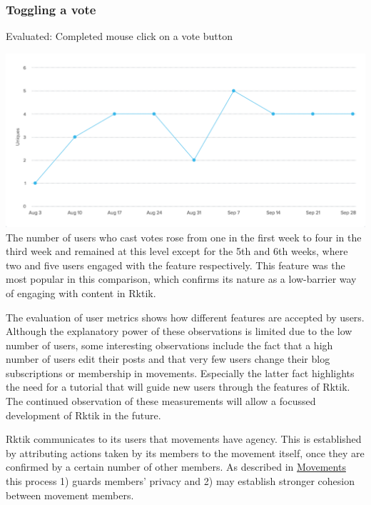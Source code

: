 \subsubsection{Toggling a vote}\label{toggling-a-vote}

Evaluated: Completed mouse click on a vote button

\includegraphics{img/eval_vote.png}\\
 The number of users who cast votes rose from one in the first week to
four in the third week and remained at this level except for the 5th and
6th weeks, where two and five users engaged with the feature
respectively. This feature was the most popular in this comparison,
which confirms its nature as a low-barrier way of engaging with content
in Rktik.

The evaluation of user metrics shows how different features are accepted
by users. Although the explanatory power of these observations is
limited due to the low number of users, some interesting observations
include the fact that a high number of users edit their posts and that
very few users change their blog subscriptions or membership in
movements. Especially the latter fact highlights the need for a tutorial
that will guide new users through the features of Rktik. The continued
observation of these measurements will allow a focussed development of
Rktik in the future.


Rktik communicates to its users that movements have agency. This is
established by attributing actions taken by its members to the movement
itself, once they are confirmed by a certain number of other members. As
described in \hyperref[movements]{Movements} this process 1) guards
members' privacy and 2) may establish stronger cohesion between movement
members.

